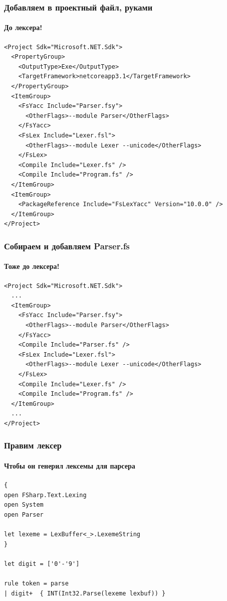 \documentclass[xetex,mathserif,serif]{beamer}
\begin{document}
    \begin{frame}[fragile]
        \frametitle{Добавляем в проектный файл, руками}
        \framesubtitle{До лексера!}
        \begin{scriptsize}
            \begin{verbatim}
<Project Sdk="Microsoft.NET.Sdk">
  <PropertyGroup>
    <OutputType>Exe</OutputType>
    <TargetFramework>netcoreapp3.1</TargetFramework>
  </PropertyGroup>
  <ItemGroup>
    <FsYacc Include="Parser.fsy">
      <OtherFlags>--module Parser</OtherFlags>
    </FsYacc>
    <FsLex Include="Lexer.fsl">
      <OtherFlags>--module Lexer --unicode</OtherFlags>
    </FsLex>
    <Compile Include="Lexer.fs" />
    <Compile Include="Program.fs" />
  </ItemGroup>
  <ItemGroup>
    <PackageReference Include="FsLexYacc" Version="10.0.0" />
  </ItemGroup>
</Project>
            \end{verbatim}
        \end{scriptsize}
    \end{frame}

    \begin{frame}[fragile]
        \frametitle{Собираем и добавляем Parser.fs}
        \framesubtitle{Тоже до лексера!}
        \begin{scriptsize}
            \begin{verbatim}
<Project Sdk="Microsoft.NET.Sdk">
  ...
  <ItemGroup>
    <FsYacc Include="Parser.fsy">
      <OtherFlags>--module Parser</OtherFlags>
    </FsYacc>
    <Compile Include="Parser.fs" />
    <FsLex Include="Lexer.fsl">
      <OtherFlags>--module Lexer --unicode</OtherFlags>
    </FsLex>
    <Compile Include="Lexer.fs" />
    <Compile Include="Program.fs" />
  </ItemGroup>
  ...
</Project>
            \end{verbatim}
        \end{scriptsize}
    \end{frame}

    \begin{frame}[fragile]
        \frametitle{Правим лексер}
        \framesubtitle{Чтобы он генерил лексемы для парсера}
        \begin{small}
            \begin{verbatim}
{ 
open FSharp.Text.Lexing
open System
open Parser

let lexeme = LexBuffer<_>.LexemeString
}

let digit = ['0'-'9']

rule token = parse
| digit+  { INT(Int32.Parse(lexeme lexbuf)) }
            \end{verbatim}
        \end{small}
    \end{frame}
\end{document}
